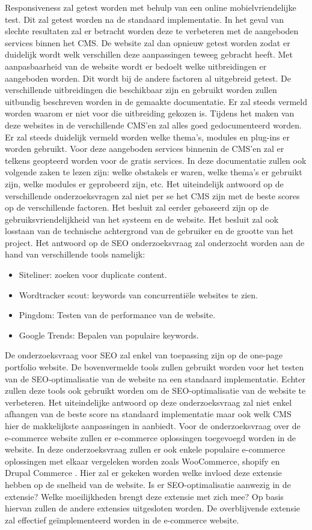 Responsiveness zal getest worden met behulp van een online mobielvriendelijke test. Dit zal getest worden na de standaard implementatie. In het geval van slechte resultaten zal er betracht worden deze te  verbeteren met de aangeboden services binnen het CMS. De website zal dan opnieuw getest worden zodat er duidelijk wordt welk verschillen deze aanpassingen teweeg gebracht heeft.
Met aanpasbaarheid van de website wordt er bedoelt welke uitbreidingen er aangeboden worden. Dit wordt bij de andere factoren al uitgebreid getest. De verschillende uitbreidingen die beschikbaar zijn en gebruikt worden zullen uitbundig beschreven worden in de gemaakte documentatie. Er zal steeds vermeld worden waarom er niet voor die uitbreiding gekozen is.
Tijdens het maken van deze websites in de verschillende CMS'en zal alles goed gedocumenteerd worden. Er zal steeds duidelijk vermeld worden welke thema's, modules en  plug-ins er worden gebruikt. Voor deze aangeboden services binnenin de CMS'en zal er telkens geopteerd worden voor de gratis services. In deze documentatie zullen ook volgende zaken te lezen zijn: welke obstakels er waren, welke thema's er gebruikt zijn, welke modules er geprobeerd zijn, etc.
Het uiteindelijk antwoord op de verschillende onderzoeksvragen zal niet per se het CMS zijn met de beste scores op de verschillende factoren. Het besluit zal eerder gebaseerd zijn op de gebruiksvriendelijkheid van het systeem en de website. Het besluit zal ook losstaan van de technische achtergrond van de gebruiker en de grootte van het project.
Het antwoord op de SEO onderzoeksvraag zal onderzocht worden aan de hand van verschillende tools namelijk:

\begin{itemize}
	\item Siteliner: zoeken voor duplicate content.
	\item Wordtracker scout: keywords van concurrentiële websites te zien.
	\item Pingdom: Testen van de performance van de website.
	\item Google Trends: Bepalen van populaire keywords.
\end{itemize}
De onderzoeksvraag voor SEO zal enkel van toepassing zijn op de one-page portfolio website. De bovenvermelde tools zullen gebruikt worden voor het testen van de SEO-optimalisatie van de website na een standaard implementatie. Echter zullen deze tools ook gebruikt worden om de SEO-optimalisatie van de website te verbeteren. Het uiteindelijke antwoord op deze onderzoeksvraag zal niet enkel afhangen van de beste score na standaard implementatie maar ook welk CMS hier de makkelijkste aanpassingen in aanbiedt.
Voor de onderzoeksvraag over de e-commerce website zullen er e-commerce oplossingen toegevoegd worden in de website. In deze onderzoeksvraag zullen er ook enkele populaire e-commerce oplossingen met elkaar vergeleken worden zoals WooCommerce, shopify en Drupal Commerce \autocite{BWPL2017a}. Hier zal er gekeken worden welke invloed deze extensie hebben op de snelheid van de website. Is er SEO-optimalisatie aanwezig in de extensie? Welke moeilijkheden brengt deze extensie met zich mee? Op basis hiervan zullen de andere extensies uitgesloten worden. De overblijvende extensie zal effectief geïmplementeerd worden in de e-commerce website.

